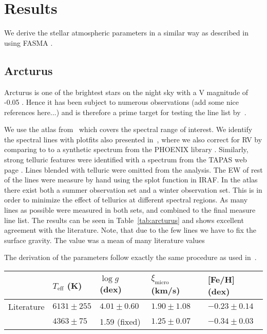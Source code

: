 \documentclass{aa}
\begin{document}
\section{Results}
\label{sec:results}

We derive the stellar atmospheric parameters in a similar way as described in
\citet{Andreasen2016} using FASMA \citep{Andreasen2017a}.


\subsection{Arcturus}
\label{sec:arcturus}
Arcturus is one of the brightest stars on the night sky with a V magnitude of
-0.05 \citep{Ducati2002}. Hence it has been subject to numerous observations
(add some nice references here...) and is therefore a prime target for testing
the line list by~\cite{Andreasen2016}.

We use the atlas from~\cite{Hinkle2003} which covers the spectral range of
interest. We identify the spectral lines with plot\textunderscore{}fits also
presented in~\cite{Andreasen2016}, where we also correct for RV by comparing to
to a synthetic spectrum from the PHOENIX library \citep{Husser2013}. Similarly,
strong telluric features were identified with a spectrum from the TAPAS web page
\citep{Bertaux2014}. Lines blended with telluric were omitted from the analysis.
The EW of rest of the lines were measure by hand using the splot function in
IRAF. In the atlas there exist both a summer observation set and a winter
observation set. This is in order to minimize the effect of tellurics at
different spectral regions. As many lines as possible were measured in both
sets, and combined to the final measure line list. The results can be seen in
Table~\ref{tab:arcturus} and shows excellent agreement with the literature.
Note, that due to the few  lines we have to fix the surface gravity.
The value was a mean of many literature values

The derivation of the parameters follow exactly the same procedure as used
in~\cite{Andreasen2016}.

\begin{table*}[htb!]
    \caption{The derived parameters for Arcturus with
    fixed surface gravity cut after 3$\sigma$ outlier removal. linelist: arcturus2Cut4ol.moog}
    \label{tab:arcturus}
    \centering
    \begin{tabular}{lllll}
      \hline\hline
                     & $T_\mathrm{eff}$ (K) &  $\log g$ (dex)  &   $\xi_\mathrm{micro}$ (km/s)   & [Fe/H] (dex)      \\
      \hline
        Literature   & $6131 \pm 255$       &  $4.01 \pm 0.60$ &    $1.90 \pm 1.08$              & $-0.23 \pm 0.14$ \\
      \hline
                     & $4363 \pm 75$        &   1.59 (fixed)   &    $1.25 \pm 0.07$              & $-0.34 \pm 0.03$ \\
      \hline
    \end{tabular}
\end{table*}
\end{document}
